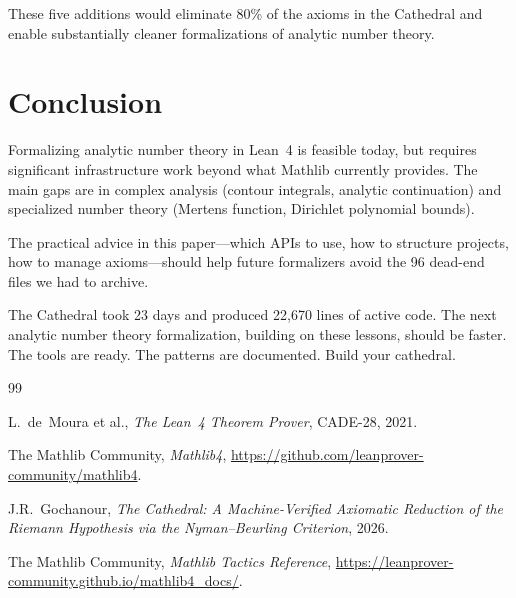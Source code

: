 \documentclass[11pt,a4paper]{article}
\begin{document}
These five additions would eliminate 80\% of the axioms in the
Cathedral and enable substantially cleaner formalizations of
analytic number theory.

\section{Conclusion}

Formalizing analytic number theory in Lean~4 is feasible today, but
requires significant infrastructure work beyond what Mathlib currently
provides. The main gaps are in complex analysis (contour integrals,
analytic continuation) and specialized number theory (Mertens function,
Dirichlet polynomial bounds).

The practical advice in this paper---which APIs to use, how to
structure projects, how to manage axioms---should help future
formalizers avoid the 96 dead-end files we had to archive.

The Cathedral took 23 days and produced 22,670 lines of active code.
The next analytic number theory formalization, building on these
lessons, should be faster. The tools are ready. The patterns are
documented. Build your cathedral.

\vspace{0.5cm}

\begin{thebibliography}{99}

L.~de~Moura et al., \emph{The Lean~4 Theorem Prover}, CADE-28, 2021.

The Mathlib Community, \emph{Mathlib4},
\url{https://github.com/leanprover-community/mathlib4}.

J.R.~Gochanour, \emph{The Cathedral: A Machine-Verified Axiomatic
Reduction of the Riemann Hypothesis via the Nyman--Beurling Criterion},
2026.

The Mathlib Community, \emph{Mathlib Tactics Reference},
\url{https://leanprover-community.github.io/mathlib4_docs/}.

\end{thebibliography}
\end{document}
